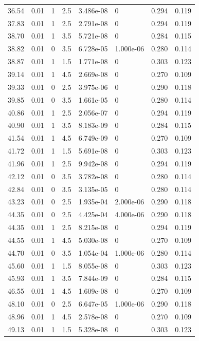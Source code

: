 \documentclass[preview]{standalone}
\begin{document}
{{{\begin{tabular}{L{1.2cm}C{1.2cm} C{0.3cm}C{0.5cm} C{1.4cm}C{1.4cm} C{1.4cm}C{1.4cm}}
  36.54  &  0.01  & 1     & 2.5 &  3.486e-08  & 0  & 0.294 &  0.119   \\ 
  37.83  &  0.01  & 1     & 2.5 &  2.791e-08  & 0  & 0.294 &  0.119   \\ 
  38.70  &  0.01  & 1     & 3.5 &  5.721e-08  & 0  & 0.284 &  0.115   \\ 
  38.82  &  0.01  & 0     & 3.5 &  6.728e-05  & 1.000e-06  & 0.280 &  0.114   \\ 
  38.87  &  0.01  & 1     & 1.5 &  1.771e-08  & 0  & 0.303 &  0.123   \\ 
  39.14  &  0.01  & 1     & 4.5 &  2.669e-08  & 0  & 0.270 &  0.109   \\ 
  39.33  &  0.01  & 0     & 2.5 &  3.975e-06  & 0  & 0.290 &  0.118   \\ 
  39.85  &  0.01  & 0     & 3.5 &  1.661e-05  & 0  & 0.280 &  0.114   \\ 
  40.86  &  0.01  & 1     & 2.5 &  2.056e-07  & 0  & 0.294 &  0.119   \\ 
  40.90  &  0.01  & 1     & 3.5 &  8.183e-09  & 0  & 0.284 &  0.115   \\ 
  41.54  &  0.01  & 1     & 4.5 &  6.749e-09  & 0  & 0.270 &  0.109   \\ 
  41.72  &  0.01  & 1     & 1.5 &  5.691e-08  & 0  & 0.303 &  0.123   \\ 
  41.96  &  0.01  & 1     & 2.5 &  9.942e-08  & 0  & 0.294 &  0.119   \\ 
  42.12  &  0.01  & 0     & 3.5 &  3.782e-08  & 0  & 0.280 &  0.114   \\ 
  42.84  &  0.01  & 0     & 3.5 &  3.135e-05  & 0  & 0.280 &  0.114   \\ 
  43.23  &  0.01  & 0     & 2.5 &  1.935e-04  & 2.000e-06  & 0.290 &  0.118   \\ 
  44.35  &  0.01  & 0     & 2.5 &  4.425e-04  & 4.000e-06  & 0.290 &  0.118   \\ 
  44.35  &  0.01  & 1     & 2.5 &  8.215e-08  & 0  & 0.294 &  0.119   \\ 
  44.55  &  0.01  & 1     & 4.5 &  5.030e-08  & 0  & 0.270 &  0.109   \\ 
  44.70  &  0.01  & 0     & 3.5 &  1.054e-04  & 1.000e-06  & 0.280 &  0.114   \\ 
  45.60  &  0.01  & 1     & 1.5 &  8.055e-08  & 0  & 0.303 &  0.123   \\ 
  45.93  &  0.01  & 1     & 3.5 &  7.844e-09  & 0  & 0.284 &  0.115   \\ 
  46.55  &  0.01  & 1     & 4.5 &  1.609e-08  & 0  & 0.270 &  0.109   \\ 
  48.10  &  0.01  & 0     & 2.5 &  6.647e-05  & 1.000e-06  & 0.290 &  0.118   \\ 
  48.96  &  0.01  & 1     & 4.5 &  2.578e-08  & 0  & 0.270 &  0.109   \\ 
  49.13  &  0.01  & 1     & 1.5 &  5.328e-08  & 0  & 0.303 &  0.123   \\ 
\hline 
\end{tabular} 

}}}
\end{document}
